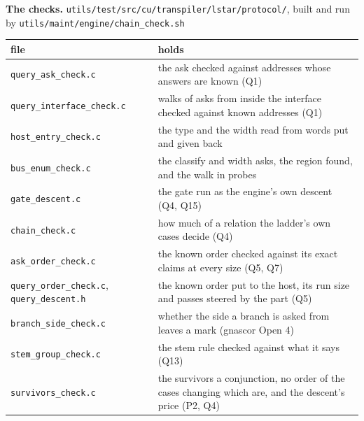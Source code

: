 \textbf{The checks.} \texttt{utils/\allowbreak{}test/\allowbreak{}src/\allowbreak{}cu/\allowbreak{}transpiler/\allowbreak{}lstar/\allowbreak{}protocol/\allowbreak{}}, built and run by \texttt{utils/\allowbreak{}maint/\allowbreak{}engine/\allowbreak{}chain\_\allowbreak{}check.\allowbreak{}sh}

{\small
\setlength{\tabcolsep}{6pt}
\begin{longtable}{>{\RaggedRight\arraybackslash}p{}>{\RaggedRight\arraybackslash}p{}}
\toprule
file & holds \\
\midrule
\endhead
\texttt{query\_\allowbreak{}ask\_\allowbreak{}check.\allowbreak{}c} & the ask checked against addresses whose answers are known (Q1) \\
\texttt{query\_\allowbreak{}interface\_\allowbreak{}check.\allowbreak{}c} & walks of asks from inside the interface checked against known addresses (Q1) \\
\texttt{host\_\allowbreak{}entry\_\allowbreak{}check.\allowbreak{}c} & the type and the width read from words put and given back \\
\texttt{bus\_\allowbreak{}enum\_\allowbreak{}check.\allowbreak{}c} & the classify and width asks, the region found, and the walk in probes \\
\texttt{gate\_\allowbreak{}descent.\allowbreak{}c} & the gate run as the engine's own descent (Q4, Q15) \\
\texttt{chain\_\allowbreak{}check.\allowbreak{}c} & how much of a relation the ladder's own cases decide (Q4) \\
\texttt{ask\_\allowbreak{}order\_\allowbreak{}check.\allowbreak{}c} & the known order checked against its exact claims at every size (Q5, Q7) \\
\texttt{query\_\allowbreak{}order\_\allowbreak{}check.\allowbreak{}c}, \texttt{query\_\allowbreak{}descent.\allowbreak{}h} & the known order put to the host, its run size and passes steered by the part (Q5) \\
\texttt{branch\_\allowbreak{}side\_\allowbreak{}check.\allowbreak{}c} & whether the side a branch is asked from leaves a mark (gnascor Open 4) \\
\texttt{stem\_\allowbreak{}group\_\allowbreak{}check.\allowbreak{}c} & the stem rule checked against what it says (Q13) \\
\texttt{survivors\_\allowbreak{}check.\allowbreak{}c} & the survivors a conjunction, no order of the cases changing which are, and the descent's price (P2, Q4) \\

\end{longtable}}
